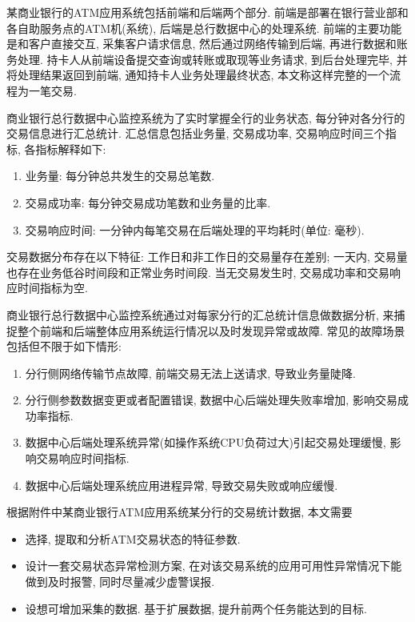 某商业银行的ATM应用系统包括前端和后端两个部分. 前端是部署在银行营业部和各自助服务点的ATM机(系统), 后端是总行数据中心的处理系统. 前端的主要功能是和客户直接交互, 采集客户请求信息, 然后通过网络传输到后端, 再进行数据和账务处理. 持卡人从前端设备提交查询或转账或取现等业务请求, 到后台处理完毕, 并将处理结果返回到前端, 通知持卡人业务处理最终状态, 本文称这样完整的一个流程为一笔交易.

商业银行总行数据中心监控系统为了实时掌握全行的业务状态, 每分钟对各分行的交易信息进行汇总统计. 汇总信息包括业务量, 交易成功率, 交易响应时间三个指标, 各指标解释如下:

\begin{enumerate}
    \item 业务量: 每分钟总共发生的交易总笔数.
    \item 交易成功率: 每分钟交易成功笔数和业务量的比率.
    \item 交易响应时间: 一分钟内每笔交易在后端处理的平均耗时(单位: 毫秒).
\end{enumerate}

交易数据分布存在以下特征: 工作日和非工作日的交易量存在差别; 一天内, 交易量也存在业务低谷时间段和正常业务时间段. 当无交易发生时, 交易成功率和交易响应时间指标为空.

商业银行总行数据中心监控系统通过对每家分行的汇总统计信息做数据分析, 来捕捉整个前端和后端整体应用系统运行情况以及时发现异常或故障. 常见的故障场景包括但不限于如下情形:

\begin{enumerate}
    \item 分行侧网络传输节点故障, 前端交易无法上送请求, 导致业务量陡降.
    \item 分行侧参数数据变更或者配置错误, 数据中心后端处理失败率增加, 影响交易成功率指标.
    \item 数据中心后端处理系统异常(如操作系统CPU负荷过大)引起交易处理缓慢, 影响交易响应时间指标.
    \item 数据中心后端处理系统应用进程异常, 导致交易失败或响应缓慢.
\end{enumerate}

根据附件中某商业银行ATM应用系统某分行的交易统计数据, 本文需要
\begin{itemize}
    \item 选择, 提取和分析ATM交易状态的特征参数.
    \item 设计一套交易状态异常检测方案, 在对该交易系统的应用可用性异常情况下能做到及时报警, 同时尽量减少虚警误报.
    \item 设想可增加采集的数据. 基于扩展数据, 提升前两个任务能达到的目标.
\end{itemize}
